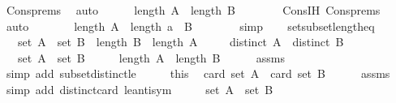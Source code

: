 \begin{isabellebody}
\ Cons{\isachardot}prems\ \isamarkupfalse%
\ auto\isanewline
\ \ \ \ \isamarkupfalse%
\ {\isachardoublequoteopen}length\ A\ {\isasymle}\ length\ B{\isachardoublequoteclose}\isanewline
\ \ \ \ \ \ \isamarkupfalse%
\ Cons{\isachardot}IH\ Cons{\isachardot}prems\ \isamarkupfalse%
\ auto\isanewline
\ \ \ \ \isamarkupfalse%
\ \isamarkupfalse%
\ {\isachardoublequoteopen}length\ A\ {\isasymle}\ length\ {\isacharparenleft}a\ {\isacharhash}\ B{\isacharparenright}{\isachardoublequoteclose}\isanewline
\ \ \ \ \ \ \isamarkupfalse%
\ simp\isanewline
\ \ \isamarkupfalse%
\isanewline
{}\isamarkupfalse%
%
\endisatagproof
{\isafoldproof}%
%
\isadelimproof
\isanewline
%
\endisadelimproof
\isanewline
{}\isamarkupfalse%
\ set{\isacharunderscore}subset{\isacharunderscore}length{\isacharunderscore}eq{\isacharcolon}\isanewline
\ \ \ {\isachardoublequoteopen}set\ A\ {\isasymsubseteq}\ set\ B{\isachardoublequoteclose}\ \ {\isachardoublequoteopen}length\ B\ {\isasymle}\ length\ A{\isachardoublequoteclose}\isanewline
\ \ \ \ \ {\isachardoublequoteopen}distinct\ A{\isachardoublequoteclose}\ \ {\isachardoublequoteopen}distinct\ B{\isachardoublequoteclose}\isanewline
\ \ \ {\isachardoublequoteopen}set\ A\ {\isacharequal}\ set\ B{\isachardoublequoteclose}\isanewline
%
\isadelimproof
%
\endisadelimproof
%
\isatagproof
{}\isamarkupfalse%
\ {\isacharminus}\isanewline
\ \ \isamarkupfalse%
\ {\isachardoublequoteopen}length\ A\ {\isasymle}\ length\ B{\isachardoublequoteclose}\isanewline
\ \ \ \ \isamarkupfalse%
\ assms\ \isamarkupfalse%
\ {\isacharparenleft}simp\ add{\isacharcolon}\ subset{\isacharunderscore}distinct{\isacharunderscore}le{\isacharparenright}\isanewline
\ \ \isamarkupfalse%
\ \isamarkupfalse%
\ this\ \isamarkupfalse%
\ {\isachardoublequoteopen}card\ {\isacharparenleft}set\ A{\isacharparenright}\ {\isacharequal}\ card\ {\isacharparenleft}set\ B{\isacharparenright}{\isachardoublequoteclose}\isanewline
\ \ \ \ \isamarkupfalse%
\ assms\ \isamarkupfalse%
\ {\isacharparenleft}simp\ add{\isacharcolon}\ distinct{\isacharunderscore}card\ le{\isacharunderscore}antisym{\isacharparenright}\isanewline
\ \ \isamarkupfalse%
\ \isamarkupfalse%
\ {\isachardoublequoteopen}set\ A\ {\isacharequal}\ set\ B{\isachardoublequoteclose}\isanewline

\end{isabellebody}

